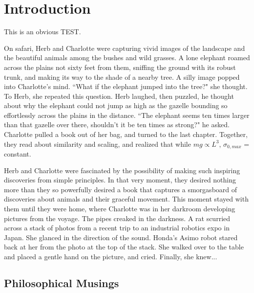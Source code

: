 \chapter{Introduction}
\label{sec:Introduction}

This is an obvious TEST. 

On safari, Herb and Charlotte were capturing vivid images of the landscape and the beautiful animals among the bushes and wild grasses. A lone elephant roamed across the plains not sixty feet from them, sniffing the ground with its robust trunk, and making its way to the shade of a nearby tree. A silly image popped into Charlotte's mind. ``What if the elephant jumped into the tree?" she thought. To Herb, she repeated this question. Herb laughed, then puzzled, he thought about why the elephant could not jump as high as the gazelle bounding so effortlessly across the plains in the distance. ``The elephant seems ten times larger than that gazelle over there, shouldn't it be ten times as strong?" he asked. Charlotte pulled a book \cite{mcmahon84} out of her bag, and turned to the last chapter. Together, they read about similarity and scaling, and realized that while $mg \propto L^{3}$, $\sigma_{0, max}$ = constant.

Herb and Charlotte were fascinated by the possibility of making such inspiring discoveries from simple principles. In that very moment, they desired nothing more than they so powerfully desired a book that captures a smorgasboard of discoveries about animals and their graceful movement. This moment stayed with them until they were home, where Charlotte was in her darkroom developing pictures from the voyage. The pipes creaked in the darkness. A rat scurried across a stack of photos from a recent trip to an industrial robotics expo in Japan. She glanced in the direction of the sound. Honda's Asimo robot stared back at her from the photo at the top of the stack. She walked over to the table and placed a gentle hand on the picture, and cried. Finally, she knew...

\section{Philosophical Musings}

